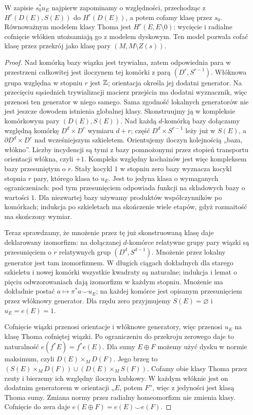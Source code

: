 W zapisie $s_0^*u_E$ najpierw zapominamy o względności,
przechodząc z $H^r(D(E),S(E))$ do $H^r(D(E))$,
a potem cofamy klasę przez $s_0$. Równoważnym modelem
klasy Thoma jest $H^r(E,E\setminus0)$: wycięcie
i radialne cofnięcie włókien utożsamiają go z modelem
dyskowym. Ten model pozwala cofać klasę przez przekrój
jako klasę pary $(M,M\setminus Z(s))$.

\begin{proof}
Nad komórką bazy wiązka jest trywialna, zatem odpowiednia
para w przestrzeni całkowitej jest iloczynem tej komórki
z parą $(D^r,S^{r-1})$.
Włóknowa grupa względna
w stopniu $r$ jest $\mathbb{Z}$;
orientacja określa jej
dodatni generator.
Na przecięciu sąsiednich
trywializacji macierz
przejścia ma dodatni
wyznacznik, więc przenosi
ten generator w niego
samego. Sama zgodność lokalnych generatorów nie jest jeszcze
dowodem istnienia globalnej klasy. Skonstruujmy ją
w kompleksie komórkowym pary $(D(E),S(E))$.
Nad każdą $d$-komórką bazy dołączamy względną
komórkę $D^d\times D^r$ wymiaru $d+r$;
część $D^d\times S^{r-1}$ leży już w $S(E)$,
a $\partial D^d\times D^r$ nad wcześniejszym szkieletem.
Orientujemy iloczyn kolejnością „baza, włókno”.
Liczby incydencji są tymi z bazy pomnożonymi
przez stopień transportu orientacji włókna, czyli $+1$.
Kompleks względny kochainów jest więc kompleksem
bazy przesuniętym o $r$. Stały kocykl $1$ w stopniu
zero bazy wyznacza kocykl stopnia $r$ pary,
którego klasa to $u_E$. Jest to jedyna klasa
o wymaganych ograniczeniach: pod tym przesunięciem
odpowiada funkcji na składowych bazy o wartości $1$.
Dla niezwartej bazy używamy produktów współczynników
po komórkach; indukcja po szkieletach ma skończenie
wiele etapów, gdyż rozmaitość ma skończony wymiar.

Teraz sprawdzamy, że mnożenie przez tę już
skonstruowaną klasę daje deklarowany izomorfizm:
na dołączanej $d$-komórce
relatywne grupy pary
wiązki są przesunięciem
o $r$ relatywnych grup
$(D^d,S^{d-1})$.
Mnożenie przez lokalny
generator jest tam
izomorfizmem. W długich
ciągach dokładnych
dla starego szkieletu
i nowej komórki wszystkie
kwadraty są naturalne;
indukcja i lemat o
pięciu odwzorowaniach
dają izomorfizm w
każdym stopniu.
Mnożenie ma dokładnie postać
$a\mapsto\pi^*a\smile u_E$; na każdej komórce
jest opisanym przesunięciem przez włóknowy generator.
Dla rzędu zero przyjmujemy $S(E)=\varnothing$
i $u_E=e(E)=1$.

Cofnięcie wiązki przenosi
orientacje i włóknowe
generatory, więc przenosi
$u_E$ na klasę Thoma
cofniętej wiązki. Po
ograniczeniu do
przekroju zerowego
daje to naturalność
$e(f^*E)=f^*e(E)$.
Dla sumy $E\oplus F$ możemy użyć dysku w normie
maksimum, czyli $D(E)\times_M D(F)$. Jego brzeg to
$(S(E)\times_M D(F))\cup(D(E)\times_M S(F))$.
Cofamy obie klasy Thoma przez rzuty i bierzemy
ich względny iloczyn kubkowy. W każdym włóknie
jest on dodatnim generatorem w orientacji „$E$, potem $F$”,
więc z jedyności jest klasą Thoma sumy.
Zmiana normy przez radialny homeomorfizm nie zmienia
klasy. Cofnięcie do zera daje
$e(E\oplus F)=e(E)\smile e(F)$.


\end{proof}
